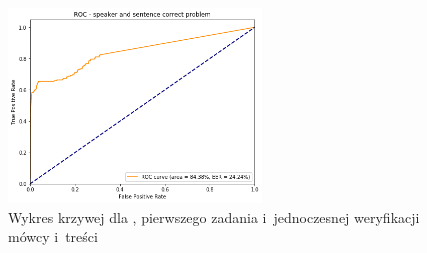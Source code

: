 \begin{figure}[H]
    \centering
    \includegraphics[width=0.6\textwidth]{images/4_3_dnn_roc_both}
    \caption{Wykres krzywej  dla , pierwszego zadania  i~jednoczesnej weryfikacji mówcy i~treści}
    \label{fig:4_3_dnn_roc_both}
\end{figure}


